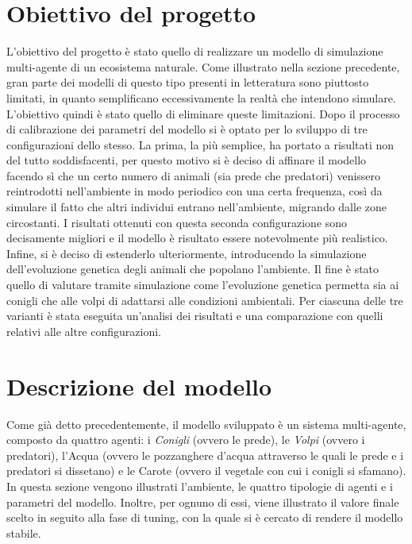 \documentclass[11pt]{article}
\begin{document}
\section{Obiettivo del progetto}
L'obiettivo del progetto è stato quello di realizzare un modello di simulazione multi-agente di un ecosistema naturale. Come illustrato nella sezione precedente, gran parte dei modelli di questo tipo presenti in letteratura sono piuttosto limitati, in quanto semplificano eccessivamente la realtà che intendono simulare. L'obiettivo quindi è stato quello di eliminare queste limitazioni. Dopo il processo di calibrazione dei parametri del modello si è optato per lo sviluppo di tre configurazioni dello stesso. La prima, la più semplice, ha portato a risultati non del tutto soddisfacenti, per questo motivo si è deciso di affinare il modello facendo sì che un certo numero di animali (sia prede che predatori) venissero reintrodotti nell'ambiente in modo periodico con una certa frequenza, così da simulare il fatto che altri individui entrano nell'ambiente, migrando dalle zone circostanti. I risultati ottenuti con questa seconda configurazione sono decisamente migliori e il modello è risultato essere notevolmente più realistico. Infine, si è deciso di estenderlo ulteriormente, introducendo la simulazione dell'evoluzione genetica degli animali che popolano l'ambiente. Il fine è stato quello di valutare tramite simulazione come l'evoluzione genetica permetta sia ai conigli che alle volpi di adattarsi alle condizioni ambientali. Per ciascuna delle tre varianti è stata eseguita un'analisi dei risultati e una comparazione con quelli relativi alle altre configurazioni. 

\section{Descrizione del modello}
Come già detto precedentemente, il modello sviluppato è un sistema multi-agente, composto da quattro agenti: i \emph{Conigli} (ovvero le prede), le \emph{Volpi} (ovvero i predatori), l'Acqua (ovvero le pozzanghere d'acqua attraverso le quali le prede e i predatori si dissetano) e le Carote (ovvero il vegetale con cui i conigli si sfamano). In questa sezione vengono illustrati l'ambiente, le quattro tipologie di agenti e i parametri del modello. Inoltre, per ognuno di essi, viene illustrato il valore finale scelto in seguito alla fase di tuning, con la quale si è cercato di rendere il modello stabile. 
\end{document}
